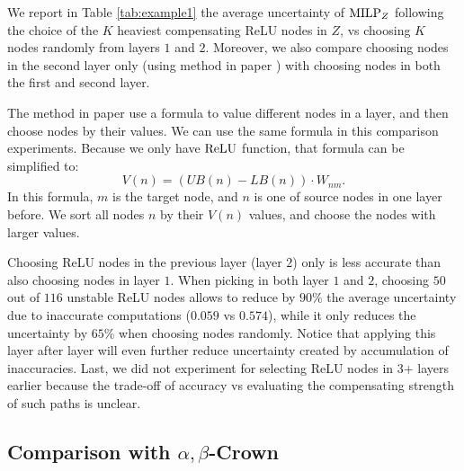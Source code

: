 {\color{red} We report in Table \ref{tab:example1} the average uncertainty of ${\textrm{MILP}}_Z$ following the choice of the $K$ heaviest compensating ReLU nodes in $Z$, vs choosing $K$ nodes randomly from layers $1$ and $2$. 
	Moreover, we also compare choosing nodes in the second layer only (using method in paper \cite{ DivideAndSlide}) with choosing nodes in both the first and second layer.
	
	
		The method in paper \cite{ DivideAndSlide} use a formula to value different nodes in a layer, and then choose nodes by their values. We can use the same formula in this comparison experiments. Because we only have $\mathrm{ReLU}$ function, that formula can be simplified to: $$V(n) = (UB(n)-LB(n))\cdot W_{nm}.$$ In this formula, $m$ is the target node, and $n$ is one of source nodes in one layer before. We sort all nodes $n$ by their $V(n)$ values, and choose the nodes with larger values. 
	
	
	
	Choosing ReLU nodes in the previous layer (layer $2$) only is less accurate than 
	also choosing nodes in layer $1$. 	When picking in both layer $1$ and $2$, choosing $50$ out of $116$ unstable ReLU nodes allows to reduce by $90\%$ the average uncertainty due to inaccurate computations ($0.059$ vs $0.574$), while it only reduces the uncertainty by $65\%$ when choosing nodes randomly. Notice that applying this layer after layer will even further reduce uncertainty created by accumulation of inaccuracies. 
	Last, we did not experiment for selecting ReLU nodes in 3+ layers earlier because the trade-off of accuracy vs evaluating the compensating strength of such paths is unclear. 
	
}
\fi










\subsection{Comparison with $\alpha,\beta$-Crown}




